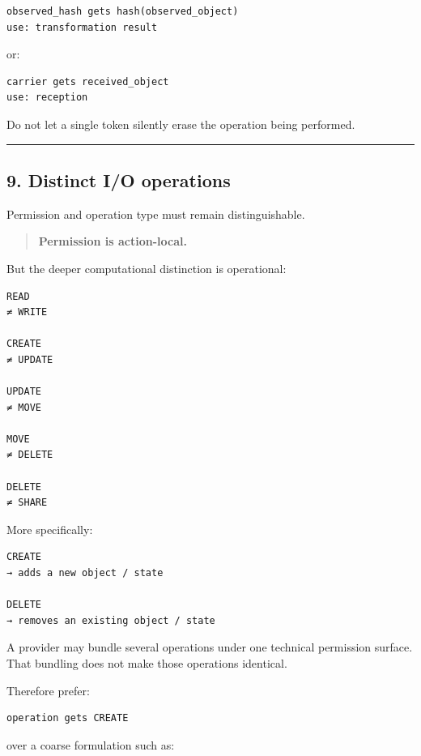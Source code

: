 \begin{verbatim}
observed_hash gets hash(observed_object)
use: transformation result
\end{verbatim}

or:

\begin{verbatim}
carrier gets received_object
use: reception
\end{verbatim}

Do not let a single token silently erase the operation being performed.

\begin{center}\rule{0.5\linewidth}{0.5pt}\end{center}

\subsection{9. Distinct I/O operations}\label{distinct-io-operations}

Permission and operation type must remain distinguishable.

\begin{quote}
\textbf{Permission is action-local.}
\end{quote}

But the deeper computational distinction is operational:

\begin{verbatim}
READ
≠ WRITE

CREATE
≠ UPDATE

UPDATE
≠ MOVE

MOVE
≠ DELETE

DELETE
≠ SHARE
\end{verbatim}

More specifically:

\begin{verbatim}
CREATE
→ adds a new object / state

DELETE
→ removes an existing object / state
\end{verbatim}

A provider may bundle several operations under one technical permission
surface. That bundling does not make those operations identical.

Therefore prefer:

\begin{verbatim}
operation gets CREATE
\end{verbatim}

over a coarse formulation such as:


